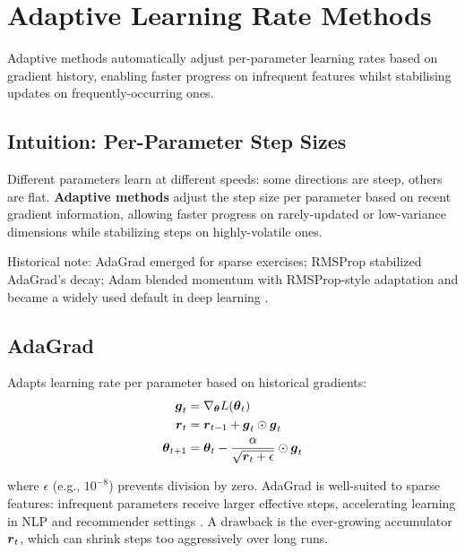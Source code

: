 
\section{Adaptive Learning Rate Methods }
\label{sec:adaptive-methods}

Adaptive methods automatically adjust per-parameter learning rates based on gradient history, enabling faster progress on infrequent features whilst stabilising updates on frequently-occurring ones.

\subsection{Intuition: Per-Parameter Step Sizes}

Different parameters learn at different speeds: some directions are steep, others are flat. \textbf{Adaptive methods} adjust the step size per parameter based on recent gradient information, allowing faster progress on rarely-updated or low-variance dimensions while stabilizing steps on highly-volatile ones.

Historical note: AdaGrad emerged for sparse exercises; RMSProp stabilized AdaGrad's decay; Adam blended momentum with RMSProp-style adaptation and became a widely used default in deep learning \cite{Duchi2011,Tieleman2012,Kingma2014,GoodfellowEtAl2016}.

\subsection{AdaGrad}

Adapts learning rate per parameter based on historical gradients:
\begin{align}
\boldsymbol{g}_t &= \nabla_{\boldsymbol{\theta}} L(\boldsymbol{\theta}_t) \\
\boldsymbol{r}_t &= \boldsymbol{r}_{t-1} + \boldsymbol{g}_t \odot \boldsymbol{g}_t \\
\boldsymbol{\theta}_{t+1} &= \boldsymbol{\theta}_t - \frac{\alpha}{\sqrt{\boldsymbol{r}_t + \epsilon}} \odot \boldsymbol{g}_t
\end{align}

where $\epsilon$ (e.g., $10^{-8}$) prevents division by zero. AdaGrad is well-suited to sparse features: infrequent parameters receive larger effective steps, accelerating learning in NLP and recommender settings \cite{Duchi2011,WebOptimizationDLBook,D2LChapterOptimization}. A drawback is the ever-growing accumulator \(\boldsymbol{r}_t\), which can shrink steps too aggressively over long runs.

